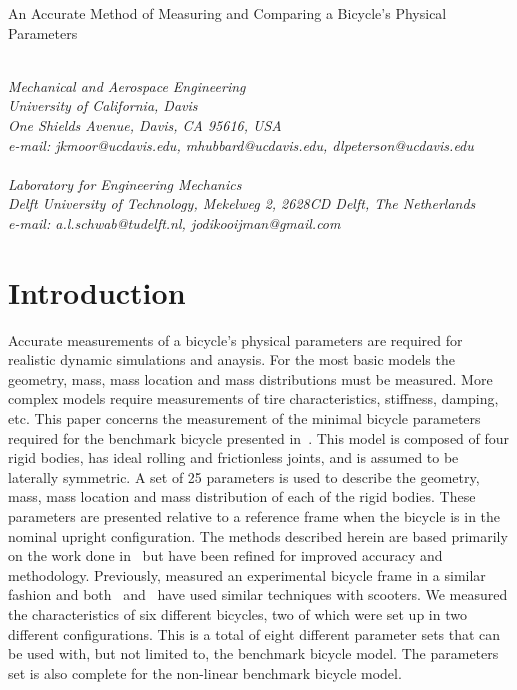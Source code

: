 \documentclass{bmd2010a}
\begin{document}
\begin{flushleft}
{\fontsize{16pt}{20pt}\selectfont%
  An Accurate Method of Measuring and Comparing a Bicycle's Physical Parameters\\}
\end{flushleft}

\begin{flushleft}
  {\\}
  \textit{Mechanical and Aerospace Engineering\\
          University of California, Davis\\
          One Shields Avenue, Davis, CA 95616, USA\\
          e-mail: jkmoor@ucdavis.edu, mhubbard@ucdavis.edu,
          dlpeterson@ucdavis.edu
  }\vspace{10pt}\\
  {\\}
  \textit{Laboratory for Engineering Mechanics\\
          Delft University of Technology, Mekelweg 2, 2628CD Delft, The
          Netherlands\\
          e-mail: a.l.schwab@tudelft.nl, jodikooijman@gmail.com
  }\vspace{10pt}\\
\end{flushleft}

\section*{Introduction}
Accurate measurements of a bicycle's physical parameters are required for
realistic dynamic simulations and anaysis. For the most basic models the geometry, mass,
mass location and mass distributions must be measured. More complex models
require measurements of tire characteristics, stiffness, damping, etc. This
paper concerns the measurement of the minimal bicycle parameters required for
the benchmark bicycle presented in~\cite{Meijaard2007}. This
model is composed of four rigid bodies, has ideal rolling and frictionless joints,
and is assumed to be laterally symmetric. A set of 25
parameters is used to describe the geometry, mass, mass location and
mass distribution of each of the rigid bodies. These parameters are presented
relative to a reference frame when the bicycle is in the nominal upright
configuration. The methods described herein are based primarily on the work
done in~\cite{Kooijman2006} but have been refined for improved accuracy and
methodology. Previously, \cite{Roland1971} measured an experimental bicycle frame in a
similar fashion and both~\cite{Dohring1953} and~\cite{Singh1971} have used
similar techniques with scooters. We measured the characteristics of six
different bicycles, two of which were set up in two different configurations.
This is a total of eight different parameter sets that can be used with, but not
limited to, the benchmark bicycle model. The parameters set is also complete
for the non-linear benchmark bicycle model.
\end{document}
